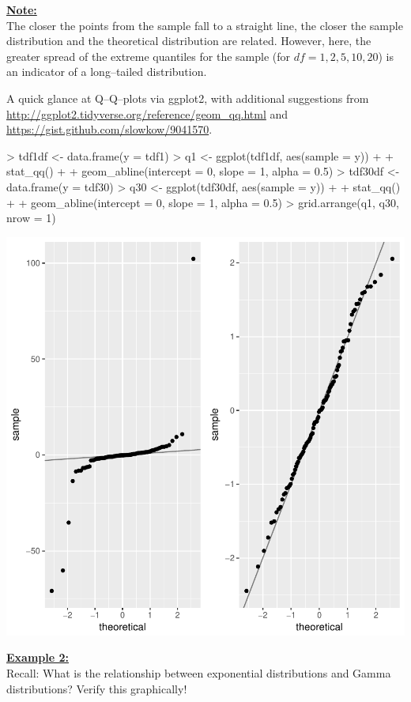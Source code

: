 \noindent
\underline{\bf Note:} \\
The closer the points from the sample fall to a straight line,
the closer the sample distribution and the theoretical distribution
are related. However, here, the greater spread of the extreme quantiles
for the sample (for $df = 1, 2, 5, 10, 20$)
is an indicator of a long--tailed distribution.


A quick glance at Q--Q--plots via ggplot2, with additional suggestions from
\url{http://ggplot2.tidyverse.org/reference/geom_qq.html} and
\url{https://gist.github.com/slowkow/9041570}.

\begin{Schunk}
\begin{Sinput}
> tdf1df <- data.frame(y = tdf1)
> q1 <- ggplot(tdf1df, aes(sample = y)) +
+   stat_qq() +
+   geom_abline(intercept = 0, slope = 1, alpha = 0.5)
> tdf30df <- data.frame(y = tdf30)
> q30 <- ggplot(tdf30df, aes(sample = y)) +
+   stat_qq() +
+   geom_abline(intercept = 0, slope = 1, alpha = 0.5)
> grid.arrange(q1, q30, nrow = 1)
\end{Sinput}
\end{Schunk}
\includegraphics{lect_chapter5_v2-032}


\noindent
\underline{\bf Example 2:} \\
Recall: What is the relationship between exponential
distributions and Gamma distributions? Verify this graphically!

